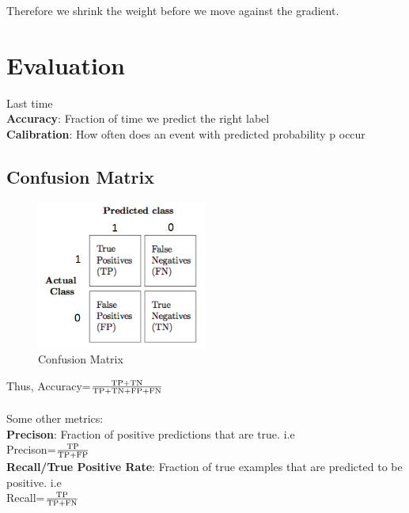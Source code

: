 Therefore we shrink the weight before we move against the gradient.

\section{Evaluation}
Last time\\
\textbf{Accuracy}: Fraction of time we predict the right label\\
\textbf{Calibration}: How often does an event with predicted probability p occur


\subsection{Confusion Matrix}
   \begin{figure}[ht]
   	\begin{center}
   		\includegraphics[width=0.5\textwidth]{figures/confusion_matrix.png}
   		\caption{
   		Confusion Matrix}
   		\label{fig:example_figure}
   	\end{center}
   \end{figure}

Thus, Accuracy=$\frac{\textnormal{TP+TN}}{\textnormal{TP+TN+FP+FN}}$\\
\\
Some other metrics:\\
\textbf{Precison}: Fraction of positive predictions that are true. i.e\\
Precison=$\frac{\textnormal{TP}}{\textnormal{TP+FP}}$ \\
\textbf{Recall/True Positive Rate}: Fraction of true examples that are predicted to be positive. i.e\\
Recall=$\frac{\textnormal{TP}}{\textnormal{TP+FN}}$ \\

